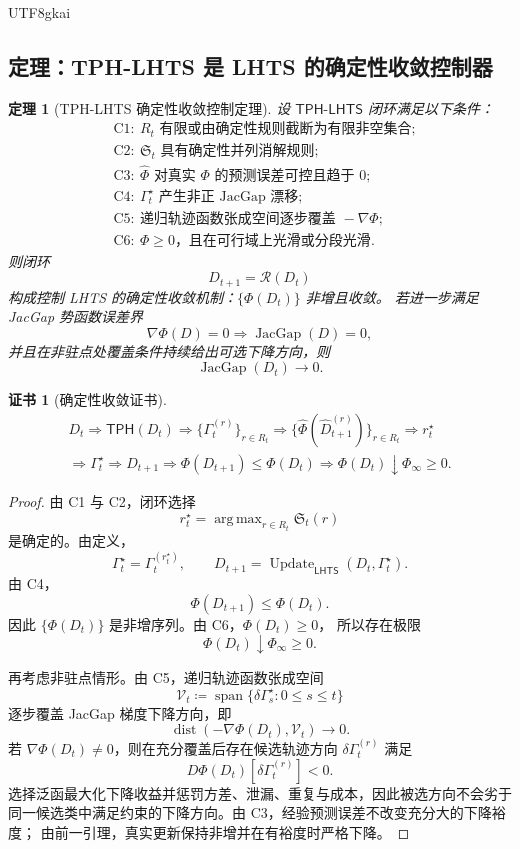 \documentclass[12pt]{article}
\newtheorem{theorem}{定理}[section]
\newtheorem{Certificate}{证书}[section]
\newcommand{\LHTS}{\ensuremath{\mathsf{LHTS}}}
\newcommand{\TPH}{\ensuremath{\mathsf{TPH}}}
\newcommand{\TPHLHTS}{\ensuremath{\mathsf{TPH\mbox{-}LHTS}}}
\newcommand{\DefEq}{\coloneqq}
\DeclareMathOperator{\JacGap}{JacGap}
\DeclareMathOperator{\Span}{span}
\DeclareMathOperator{\dist}{dist}
\DeclareMathOperator{\Update}{Update}
\DeclareMathOperator*{\argmax}{arg\,max}
\begin{document}
\begin{CJK*}{UTF8}{gkai}
\subsection{定理：TPH-LHTS 是 LHTS 的确定性收敛控制器}
\label{subsec:tph-lhts-convergence-controller}

\begin{theorem}[TPH-LHTS 确定性收敛控制定理]
设 \(\TPHLHTS\) 闭环满足以下条件：
\[
\boxed{
\begin{aligned}
&\mathrm{C1}:\ R_t\text{ 有限或由确定性规则截断为有限非空集合};\\
&\mathrm{C2}:\ \mathfrak S_t\text{ 具有确定性并列消解规则};\\
&\mathrm{C3}:\ \widehat\Phi\text{ 对真实 }\Phi\text{ 的预测误差可控且趋于 }0;\\
&\mathrm{C4}:\ \Gamma_t^\star\text{ 产生非正 JacGap 漂移};\\
&\mathrm{C5}:\ \text{递归轨迹函数张成空间逐步覆盖 }-\nabla\Phi;\\
&\mathrm{C6}:\ \Phi\ge0\text{，且在可行域上光滑或分段光滑}.
\end{aligned}
}
\]
则闭环
\[
D_{t+1}=\mathcal R(D_t)
\]
构成控制 LHTS 的确定性收敛机制：\(\{\Phi(D_t)\}\) 非增且收敛。
若进一步满足 JacGap 势函数误差界
\[
\nabla\Phi(D)=0
\Longrightarrow
\JacGap(D)=0,
\]
并且在非驻点处覆盖条件持续给出可选下降方向，则
\[
\boxed{
\JacGap(D_t)\to0.
}
\]
\end{theorem}

\begin{Certificate}[确定性收敛证书]
\[
\boxed{
\begin{gathered}
D_t
\Rightarrow
\TPH(D_t)
\Rightarrow
\{\Gamma_t^{(r)}\}_{r\in R_t}
\Rightarrow
\{\widehat\Phi(\widehat D_{t+1}^{(r)})\}_{r\in R_t}
\Rightarrow
r_t^\star
\\
\Rightarrow
\Gamma_t^\star
\Rightarrow
D_{t+1}
\Rightarrow
\Phi(D_{t+1})\le\Phi(D_t)
\Rightarrow
\Phi(D_t)\downarrow\Phi_\infty\ge0.
\end{gathered}
}
\]
\end{Certificate}

\begin{proof}
由 C1 与 C2，闭环选择
\[
r_t^\star=\argmax_{r\in R_t}\mathfrak S_t(r)
\]
是确定的。由定义，
\[
\Gamma_t^\star=\Gamma_t^{(r_t^\star)},
\qquad
D_{t+1}=\Update_{\LHTS}(D_t,\Gamma_t^\star).
\]
由 C4，
\[
\Phi(D_{t+1})\le\Phi(D_t).
\]
因此 \(\{\Phi(D_t)\}\) 是非增序列。由 C6，\(\Phi(D_t)\ge0\)，
所以存在极限
\[
\Phi(D_t)\downarrow\Phi_\infty\ge0.
\]

再考虑非驻点情形。由 C5，递归轨迹函数张成空间
\[
\mathcal V_t
\DefEq
\Span\{\delta\Gamma_s^\star:0\le s\le t\}
\]
逐步覆盖 JacGap 梯度下降方向，即
\[
\dist\!\left(-\nabla\Phi(D_t),\mathcal V_t\right)\to0.
\]
若 \(\nabla\Phi(D_t)\ne0\)，则在充分覆盖后存在候选轨迹方向
\(\delta\Gamma_t^{(r)}\) 满足
\[
D\Phi(D_t)[\delta\Gamma_t^{(r)}]<0.
\]
选择泛函最大化下降收益并惩罚方差、泄漏、重复与成本，因此被选方向不会劣于
同一候选类中满足约束的下降方向。由 C3，经验预测误差不改变充分大的下降裕度；
由前一引理，真实更新保持非增并在有裕度时严格下降。


\end{proof}
\end{CJK*}
\end{document}
